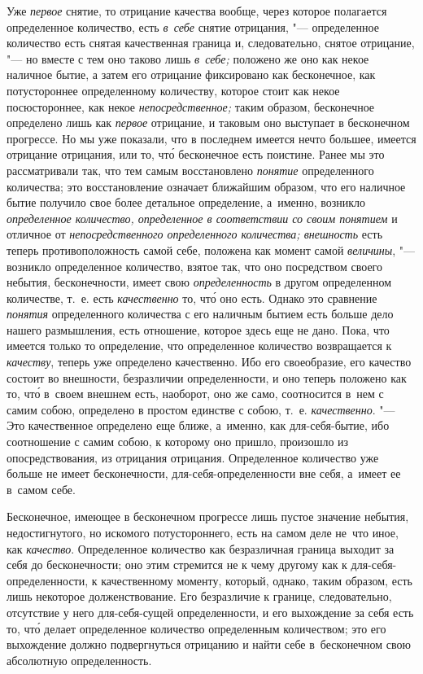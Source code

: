 Уже {\em первое} снятие, то отрицание качества вообще, через которое полагается
определенное количество, есть {\em в~себе} снятие отрицания, "--- определенное
количество есть снятая качественная граница и, следовательно, снятое отрицание,
"--- но вместе с тем оно таково лишь {\em в~себе;} положено же оно как некое
наличное бытие, а затем его отрицание фиксировано как бесконечное, как
потустороннее определенному количеству, которое стоит как некое посюстороннее,
как некое {\em непосредственное;} таким образом, бесконечное определено лишь
как {\em первое} отрицание, и таковым оно выступает в бесконечном прогрессе.
Но мы уже показали, что в последнем имеется нечто большее, имеется отрицание
отрицания, или то, чт\'{о} бесконечное есть поистине. Ранее мы это
рассматривали так, что тем самым восстановлено {\em понятие} определенного
количества; это восстановление означает ближайшим образом, что его наличное
бытие получило свое более детальное определение, а~именно, возникло
{\em определенное количество, определенное в соответствии со своим понятием}
и отличное от {\em непосредственного определенного количества; внешность} есть
теперь противоположность самой себе, положена как момент самой {\em величины},
"--- возникло определенное количество, взятое так, что оно посредством своего
небытия, бесконечности, имеет свою {\em определенность} в другом определенном
количестве, т.~е. есть {\em качественно} то, чт\'{о} оно есть. Однако это
сравнение {\em понятия} определенного количества с его наличным бытием есть
больше дело нашего размышления, есть отношение, которое здесь еще не дано.
Пока, что имеется только то определение, что определенное количество
возвращается к {\em качеству}, теперь уже определено качественно. Ибо его
своеобразие, его качество состоит во внешности, безразличии определенности,
и оно теперь положено как то, чт\'{о} в~своем внешнем есть, наоборот, оно же
само, соотносится в~нем с самим собою, определено в простом единстве с собою,
т.~е. {\em качественно}. "--- Это качественное определено еще ближе, а~именно,
как для-себя-бытие, ибо соотношение с самим собою, к которому оно пришло,
произошло из опосредствования, из отрицания отрицания. Определенное количество
уже больше не имеет бесконечности, для-себя-определенности вне себя,
а~имеет ее в~самом себе.

Бесконечное, имеющее в бесконечном прогрессе лишь пустое значение небытия,
недостигнутого, но искомого потустороннего, есть на самом деле не~что иное,
как {\em качество}. Определенное количество как безразличная граница выходит
за себя до бесконечности; оно этим стремится не к чему другому как
к для-себя-определенности, к качественному моменту, который, однако, таким
образом, есть лишь некоторое долженствование. Его безразличие к границе,
следовательно, отсутствие у него для-себя-сущей определенности, и его
выхождение за себя есть то, чт\'{о} делает определенное количество определенным
количеством; это его выхождение должно подвергнуться отрицанию и найти
себе в~бесконечном свою абсолютную определенность.

